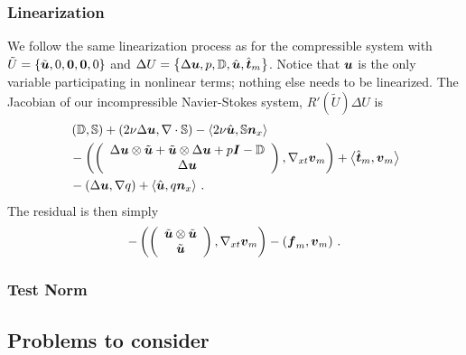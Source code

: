 \documentclass[Proposal.tex]{subfiles}
\begin{document}
\subsubsection{Linearization}
We follow the same linearization process as for the compressible system with $\tilde U=\left\{ \tilde{\boldsymbol u},0,\boldsymbol{0},\boldsymbol{0},0 \right\}$ and 
$\Delta U=\left\{ \Delta\boldsymbol u,p,\mathbb{D},\hat{\boldsymbol u},\hat{\boldsymbol t}_m \right\}$.
Notice that $\boldsymbol u$ is the only variable participating in nonlinear terms; nothing else needs to be linearized.
The Jacobian of our incompressible Navier-Stokes system, $R'(\tilde U)\Delta U$ is
\begin{align}
	&\left( \mathbb{D},\mathbb{S} \right)+\left( 2\nu\Delta\boldsymbol u,\nabla\cdot\mathbb{S} \right)-\left\langle 2\nu\hat{\boldsymbol u},\mathbb{S}\boldsymbol n_x \right\rangle\\
	&-\left( \left( \begin{array}{c} \Delta\boldsymbol u\otimes\tilde{\boldsymbol u}+\tilde{\boldsymbol u}\otimes\Delta\boldsymbol u
	+ p\boldsymbol I-\mathbb{D}\\ \Delta\boldsymbol u\\ \end{array} \right),\nabla_{xt}\boldsymbol v_m \right)+\left\langle \hat{\boldsymbol t}_m,\boldsymbol v_m \right\rangle\\
	&-\left( \Delta\boldsymbol u,\nabla q \right)+\left\langle \hat{\boldsymbol u},q\boldsymbol n_x \right\rangle\,.
\end{align}
The residual is then simply
\begin{equation}
	-\left( \left( \begin{array}{c} \tilde{\boldsymbol u}\otimes\tilde{\boldsymbol u}\\ \tilde{\boldsymbol u}\\ \end{array} \right),\nabla_{xt}\boldsymbol v_m \right)-\left( \boldsymbol f_m,\boldsymbol v_m \right)\,.
\end{equation}

%                                                                                            
%                                                                                            
%      
\subsubsection{Test Norm}

\subsection{Problems to consider}
\end{document}
